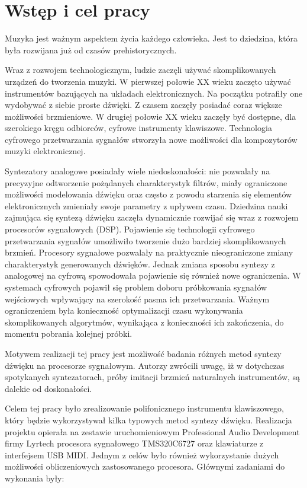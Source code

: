 \chapter{Wstęp i cel pracy}
Muzyka jest ważnym aspektem życia każdego człowieka. Jest to dziedzina, która była rozwijana już od czasów prehistorycznych. %

Wraz z rozwojem technologicznym, ludzie zaczęli używać skomplikowanych urządzeń do tworzenia muzyki. W pierwszej połowie XX wieku zaczęto używać instrumentów bazujących na układach elektronicznych.
Na początku potrafiły one wydobywać z siebie proste dźwięki. Z czasem zaczęły posiadać coraz większe możliwości brzmieniowe. W drugiej połowie XX wieku zaczęły być dostępne, dla szerokiego kręgu odbiorców, cyfrowe instrumenty klawiszowe. Technologia cyfrowego przetwarzania sygnałów stworzyła nowe możliwości dla kompozytorów muzyki elektronicznej.

Syntezatory analogowe posiadały wiele niedoskonałości: nie pozwalały na precyzyjne odtworzenie pożądanych charakterystyk filtrów, miały ograniczone możliwości modelowania dźwięku oraz często z powodu starzenia się elementów elektronicznych zmieniały swoje parametry z upływem czasu. Dziedzina nauki zajmująca się syntezą dźwięku zaczęła dynamicznie rozwijać się wraz z rozwojem procesorów sygnałowych (DSP). Pojawienie się technologii cyfrowego przetwarzania sygnałów umożliwiło tworzenie dużo bardziej skomplikowanych brzmień. Procesory sygnałowe pozwalały na praktycznie nieograniczone zmiany charakterystyk generowanych dźwięków. Jednak zmiana sposobu syntezy z analogowej na cyfrową spowodowała pojawienie się również nowe ograniczenia. W systemach cyfrowych pojawił się problem doboru próbkowania sygnałów wejściowych wpływający na szerokość pasma ich przetwarzania.
Ważnym ograniczeniem była konieczność optymalizacji czasu wykonywania skomplikowanych algorytmów, wynikająca z konieczności ich zakończenia, do momentu pobrania kolejnej próbki.

Motywem realizacji tej pracy jest możliwość badania różnych metod syntezy dźwięku na procesorze sygnałowym. 
Autorzy zwrócili uwagę, iż w dotychczas spotykanych syntezatorach, próby imitacji brzmień naturalnych instrumentów, są dalekie od doskonałości.

Celem tej pracy było zrealizowanie polifonicznego instrumentu klawiszowego, który będzie wykorzystywał kilka typowych metod syntezy dźwięku. Realizacja projektu opierała na zestawie uruchomieniowym Professional Audio Development firmy Lyrtech procesora sygnałowego TMS320C6727 oraz klawiaturze z interfejsem USB MIDI. Jednym z celów było również wykorzystanie dużych możliwości obliczeniowych zastosowanego procesora. Głównymi zadaniami do wykonania były:


